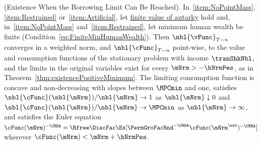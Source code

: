 \documentclass[\econtexRoot/BufferStockTheory]{subfiles}
\begin{document}
\begin{theorem}(Existence When the Borrowing Limit Can Be Reached).\label{thm:existenceNoWorst}
In~\ref{item:NoPointMass}, \ref{item:Restrained} or~\ref{item:Artificial}, let \hyperlink{FVAC}{finite value of autarky} hold and, in~\ref{item:NoPointMass} and~\ref{item:Restrained}, let minimum human wealth be finite (Condition~\eqref{eq:FiniteMinHumanWealth}).
Then $\nbl{\vFunc}_{T-n}$ converges in a weighted norm, and $\nbl{\cFunc}_{T-n}$ point-wise, to the value and consumption functions of the stationary problem with income $\tranShkNbl$, and the limits in the original variables exist for every $\mNrm>-\hNrmPes$, as in Theorem~\ref{thm:existencePositiveMinimum}.
The limiting consumption function is concave and non-decreasing with slopes between $\MPCmin$ and one, satisfies $\nbl{\cFunc}(\nbl{\mNrm})/\nbl{\mNrm}\rightarrow 1$ as $\nbl{\mNrm}\downarrow 0$ and $\nbl{\cFunc}(\nbl{\mNrm})/\nbl{\mNrm}\rightarrow\MPCmin$ as $\nbl{\mNrm}\rightarrow\infty$, and satisfies the Euler equation $\cFunc(\mNrm)^{-\CRRA}=\Rfree\DiscFac\Ex[\PermGroFacRnd^{-\CRRA}\cFunc(\mNrm^{\nxt})^{-\CRRA}]$ wherever $\cFunc(\mNrm)<\mNrm+\hNrmPes$.
\end{theorem}
\end{document}
